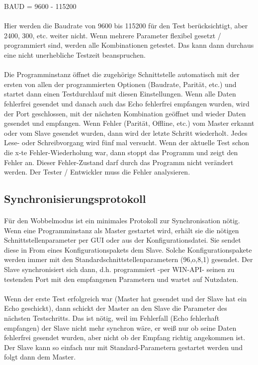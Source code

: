 \begin{center}
BAUD = 9600 - 115200
\end{center}
\paragraph{}
Hier werden die Baudrate von 9600 bis 115200 für den Test berücksichtigt, aber 2400, 300, etc. weiter nicht. Wenn mehrere Parameter flexibel gesetzt / programmiert sind, werden alle Kombinationen getestet. Das kann dann durchaus eine nicht unerhebliche Testzeit beanspruchen.
\paragraph{}
Die Programminstanz öffnet die zugehörige Schnittstelle automatisch mit der ersten von allen der programmierten Optionen (Baudrate, Parität, etc.) und startet dann einen Testdurchlauf mit diesen Einstellungen. Wenn alle Daten fehlerfrei gesendet und danach auch das Echo fehlerfrei empfangen wurden,  wird der Port geschlossen, mit der nächsten Kombination geöffnet und wieder Daten gesendet und empfangen. Wenn Fehler (Parität, Offline, etc.) vom Master erkannt oder vom Slave gesendet wurden, dann wird der letzte Schritt wiederholt. Jedes Lese- oder Schreibvorgang wird fünf mal versucht. Wenn der aktuelle Test schon die x-te Fehler-Wiederholung war, dann stoppt das Programm und zeigt den Fehler an. Dieser Fehler-Zustand darf durch das Programm nicht verändert werden. Der Tester / Entwickler muss die Fehler analysieren.

\subsection{Synchronisierungsprotokoll}
\paragraph{}
Für den Wobbelmodus ist ein minimales Protokoll zur Synchronisation nötig. Wenn eine Programminstanz als Master gestartet wird, erhält sie die nötigen Schnittstellenparameter per GUI oder aus der Konfigurationsdatei. Sie sendet diese in From eines Konfigurationspakets dem Slave. Solche Konfigurationspakete werden immer mit den Standardschnittstellenparametern (96,o,8,1) gesendet. Der Slave synchronisiert sich dann, d.h. programmiert -per WIN-API- seinen zu testenden Port mit den empfangenen Parametern und wartet auf Nutzdaten.
\paragraph{}
Wenn der erste Test erfolgreich war (Master hat gesendet und der Slave hat ein Echo geschickt), dann schickt der Master an den Slave die Parameter des nächsten Testschritts. Das ist nötig, weil im Fehlerfall (Echo fehlerhaft empfangen) der Slave nicht mehr synchron wäre, er weiß nur ob seine Daten fehlerfrei gesendet wurden, aber nicht ob der Empfang richtig angekommen ist. Der Slave kann so einfach nur mit Standard-Parametern gestartet werden und folgt dann dem Master.


